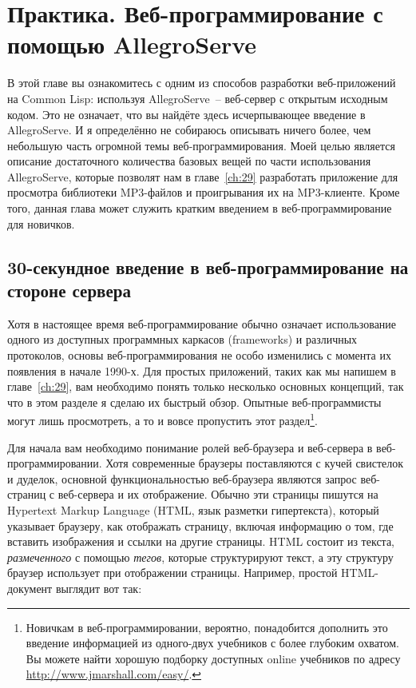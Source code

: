 \chapter{Практика. Веб-программирование с помощью AllegroServe}
\label{ch:26}

В этой главе вы ознакомитесь с одним из способов разработки веб-приложений на Common Lisp:
используя AllegroServe~-- веб-сервер с открытым исходным кодом. Это не означает, что вы
найдёте здесь исчерпывающее введение в AllegroServe. И я определённо не собираюсь
описывать ничего более, чем небольшую часть огромной темы веб-программирования. Моей целью
является описание достаточного количества базовых вещей по части использования
AllegroServe, которые позволят нам в главе~\ref{ch:29} разработать приложение для
просмотра библиотеки MP3-файлов и проигрывания их на MP3-клиенте. Кроме того, данная глава
может служить кратким введением в веб-программирование для новичков.

\section{30-секундное введение в веб-программирование на стороне сервера}

Хотя в настоящее время веб-программирование обычно означает использование одного из
доступных программных каркасов (frameworks) и различных протоколов, основы
веб-программирования не особо изменились с момента их появления в начале 1990-х. Для
простых приложений, таких как мы напишем в главе~\ref{ch:29}, вам необходимо понять только
несколько основных концепций, так что в этом разделе я сделаю их быстрый обзор. Опытные
веб-программисты могут лишь просмотреть, а то и вовсе пропустить этот
раздел\footnote{Новичкам в веб-программировании, вероятно, понадобится дополнить это
  введение информацией из одного-двух учебников с более глубоким охватом. Вы можете найти
  хорошую подборку доступных online учебников по адресу
  \url{http://www.jmarshall.com/easy/}.}.

Для начала вам необходимо понимание ролей веб-браузера и веб-сервера в
веб-программировании. Хотя современные браузеры поставляются с кучей свистелок и дуделок,
основной функциональностью веб-браузера являются запрос веб-страниц с веб-сервера и их
отображение. Обычно эти страницы пишутся на Hypertext Markup Language (HTML, язык разметки
гипертекста), который указывает браузеру, как отображать страницу, включая информацию о
том, где вставить изображения и ссылки на другие страницы. HTML состоит из текста,
\textit{размеченного} с помощью \textit{тегов}, которые структурируют текст, а эту
структуру браузер использует при отображении страницы. Например, простой HTML-документ
выглядит вот так:

